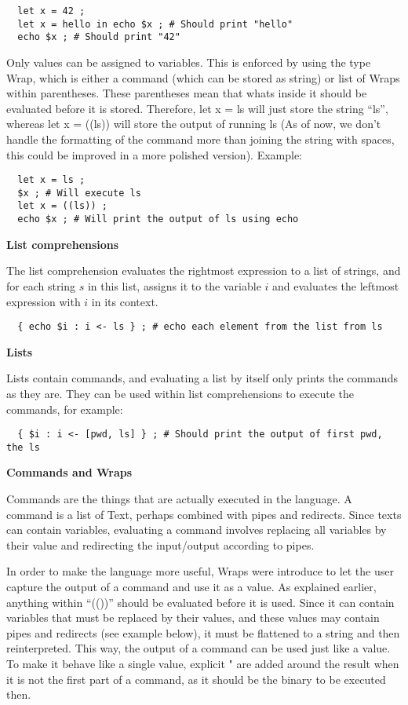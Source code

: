 \documentclass[11pt,a4paper]{article}
\begin{document}
\begin{verbatim}
  let x = 42 ;
  let x = hello in echo $x ; # Should print "hello"
  echo $x ; # Should print "42"
\end{verbatim}

Only values can be assigned to variables. This is enforced by using the type
Wrap, which is either a command (which can be stored as string) or list of
Wraps within parentheses. These parentheses mean that whats inside it should be
evaluated before it is stored. Therefore, let x = ls will just store the string
``ls'', whereas let x = ((ls)) will store the output of running ls (As of now,
we don't handle the formatting of the command more than joining the string with
spaces, this could be improved in a more polished version). Example:

\begin{verbatim}
  let x = ls ;
  $x ; # Will execute ls
  let x = ((ls)) ;
  echo $x ; # Will print the output of ls using echo
\end{verbatim}

\textbf{List comprehensions}

The list comprehension evaluates the rightmost expression to a list of strings,
and for each string $s$ in this list, assigns it to the variable $i$ and
evaluates the leftmost expression with $i$ in its context.

\begin{verbatim}
  { echo $i : i <- ls } ; # echo each element from the list from ls
\end{verbatim}

\textbf{Lists}

Lists contain commands, and evaluating a list by itself only prints the
commands as they are. They can be used within list comprehensions to execute
the commands, for example:

\begin{verbatim}
  { $i : i <- [pwd, ls] } ; # Should print the output of first pwd, the ls
\end{verbatim}

\textbf{Commands and Wraps}

Commands are the things that are actually executed in the language. A command
is a list of Text, perhaps combined with pipes and redirects. Since texts can
contain variables, evaluating a command involves replacing all variables by
their value and redirecting the input/output according to pipes.

In order to make the language more useful, Wraps were introduce to let the user
capture the output of a command and use it as a value. As explained earlier,
anything within ``(())'' should be evaluated before it is used. Since it can
contain variables that must be replaced by their values, and these values may
contain pipes and redirects (see example below), it must be flattened to a
string and then reinterpreted. This way, the output of a command can be used
just like a value. To make it behave like a single value, explicit " are added
around the result when it is not the first part of a command, as it should be
the binary to be executed then.
\end{document}
